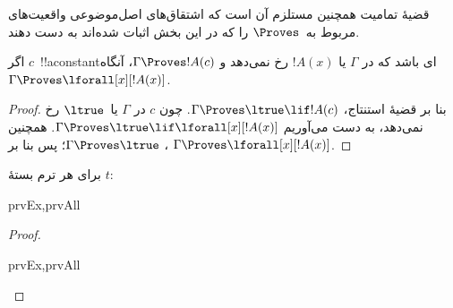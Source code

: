 \documentclass[../../../include/open-logic-section]{subfiles}
\begin{document}


\begin{explain}
  قضیهٔ تمامیت همچنین مستلزم آن است که اشتقاق‌های اصل‌موضوعی واقعیت‌های
  مربوط به~$\Proves$ را که در این بخش اثبات شده‌اند به دست دهند.
\end{explain}

\begin{thm}
 اگر $c$~!!a{constant}ای باشد که در
$\Gamma$ یا $!A(x)$ رخ نمی‌دهد و $\Gamma \Proves !A(c)$، آنگاه
$\Gamma \Proves \lforall[x][!A(x)]$.
\end{thm}

\begin{proof}
بنا بر قضیهٔ استنتاج، $\Gamma \Proves \ltrue \lif !A(c)$. چون $c$ در
$\Gamma$ یا~$\ltrue$ رخ نمی‌دهد، به دست می‌آوریم
$\Gamma \Proves \ltrue \lif \lforall[x][!A(x)]$. همچنین
$\Gamma \Proves \ltrue$؛ پس بنا بر ،
$\Gamma \Proves \lforall[x][!A(x)]$.
\end{proof}

\begin{prop}
برای هر ترم بستهٔ $t$:
\begin{tagenumerate}{prvEx,prvAll}

\end{tagenumerate}
\end{prop}

\begin{proof}
\begin{tagenumerate}{prvEx,prvAll}
\end{tagenumerate}
\end{proof}
\end{document}

